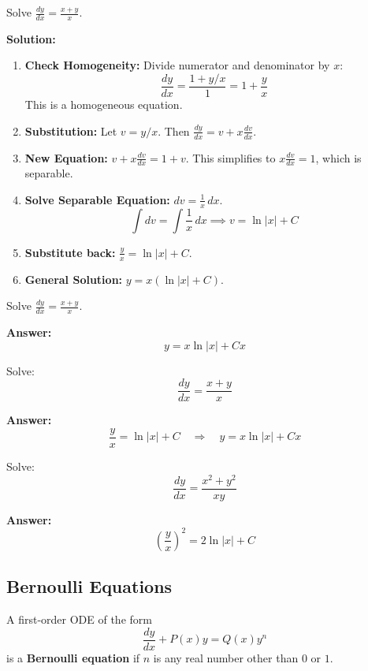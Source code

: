 \begin{example}
Solve $\frac{dy}{dx} = \frac{x+y}{x}$.

\textbf{Solution:}
\begin{enumerate}
    \item \textbf{Check Homogeneity:} Divide numerator and denominator by $x$:
    $$ \frac{dy}{dx} = \frac{1+y/x}{1} = 1+\frac{y}{x} $$
    This is a homogeneous equation.
    \item \textbf{Substitution:} Let $v=y/x$. Then $\frac{dy}{dx} = v + x\frac{dv}{dx}$.
    \item \textbf{New Equation:} $v + x\frac{dv}{dx} = 1+v$.
    This simplifies to $x\frac{dv}{dx}=1$, which is separable.
    \item \textbf{Solve Separable Equation:} $dv=\frac{1}{x}\,dx$.
    $$ \int dv = \int \frac{1}{x}\,dx \implies v = \ln|x|+C $$
    \item \textbf{Substitute back:} $\frac{y}{x} = \ln|x|+C$.
    \item \textbf{General Solution:} $y = x(\ln|x|+C)$.
\end{enumerate}
\end{example}



\begin{example}
Solve $\displaystyle \frac{dy}{dx} = \frac{x + y}{x}$.

\textbf{Answer:}
\[
y = x\ln|x| + Cx
\]
\end{example}



\begin{example}
  Solve:
$$
\frac{dy}{dx} = \frac{x + y}{x}
$$

\textbf{Answer:}
$$
\frac{y}{x} = \ln|x| + C \quad \Rightarrow \quad y = x\ln|x| + Cx
$$
\end{example}


\begin{example}
Solve:
$$
\frac{dy}{dx} = \frac{x^2 + y^2}{xy}
$$

\textbf{Answer:}
$$
\left(\frac{y}{x}\right)^2 = 2\ln|x| + C
$$
\end{example}



\subsection{Bernoulli Equations}
\begin{definition}
A first-order ODE of the form
\[\frac{dy}{dx} + P(x)y = Q(x)y^n
\]
is a \textbf{Bernoulli equation} if \(n\) is any real number other than \(0\) or \(1\).
\end{definition}

